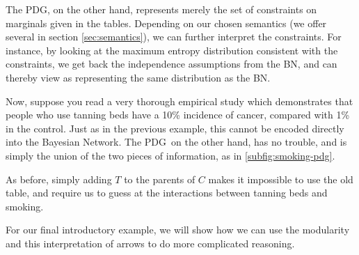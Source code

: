 \documentclass{article}
\newcommand{\MN}{PDG}
\begin{document}
\begin{example}
		The \MN, on the other hand, represents merely the set of constraints on marginals given in the tables. Depending on our chosen semantics (we offer several in section \ref{sec:semantics}), we can further interpret the constraints. For instance, by looking at the maximum entropy distribution consistent with the constraints, we get back the independence assumptions from the BN, and can thereby view  as representing the same distribution as the BN.
				
		Now, suppose you read a very thorough empirical study which demonstrates that people who use tanning beds have a 10\% incidence of cancer, compared with 1\% in the control. Just as in the previous example, this cannot be encoded directly into the Bayesian Network. 
		The \MN\, on the other hand, has no trouble, and is simply the union of the two pieces of information, as in \ref{subfig:smoking-pdg}.
		
%			
		
		As before, simply adding $T$ to the parents of $C$ makes it impossible to use the old table, and require us to guess at the interactions between tanning beds and smoking.
	\end{example}	


	
	
	For our final introductory example, we will show how we can use the modularity and this interpretation of arrows to do more complicated reasoning.
\end{document}
